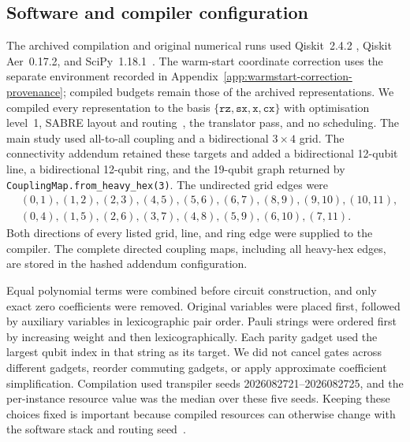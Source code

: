 \documentclass[a4paper,onecolumn,11pt,unpublished]{quantumarticle}
\theoremstyle{remark}
\begin{document}
\subsection{Software and compiler configuration}
The archived compilation and original numerical runs used Qiskit~2.4.2
\cite{Qiskit2024}, Qiskit Aer~0.17.2, and SciPy~1.18.1~\cite{Virtanen2020}. The warm-start coordinate correction
uses the separate environment recorded in
Appendix~\ref{app:warmstart-correction-provenance}; compiled budgets remain
those of the archived representations.  We compiled every representation to the basis
$\{\mathtt{rz},\mathtt{sx},\mathtt{x},\mathtt{cx}\}$ with optimisation
level~1, SABRE layout and routing~\cite{Li2019}, the translator pass,
and no scheduling.
The main study used all-to-all coupling and a bidirectional $3\times4$ grid.
The connectivity addendum retained these targets and added a bidirectional
12-qubit line, a bidirectional 12-qubit ring, and the 19-qubit graph returned
by \texttt{CouplingMap.from\_heavy\_hex(3)}.  The undirected grid edges were
\[
\begin{split}
 &(0,1),(1,2),(2,3),(4,5),(5,6),(6,7),(8,9),(9,10),(10,11),\\
 &(0,4),(1,5),(2,6),(3,7),(4,8),(5,9),(6,10),(7,11).
\end{split}
\]
Both directions of every listed grid, line, and ring edge were supplied to the
compiler.  The complete directed coupling maps, including all heavy-hex
edges, are stored in the hashed addendum configuration.

Equal polynomial terms were combined before circuit construction, and only
exact zero coefficients were removed.  Original variables were placed first,
followed by auxiliary variables in lexicographic pair order.  Pauli strings
were ordered first by increasing weight and then lexicographically.  Each
parity gadget used the largest qubit index in that string as its target.  We
did not cancel gates across different gadgets, reorder commuting gadgets, or
apply approximate coefficient simplification.  Compilation used transpiler
seeds 2026082721--2026082725, and the per-instance resource value was the
median over these five seeds.  Keeping these choices fixed is important because
compiled resources can otherwise change with the software stack and routing
seed~\cite{Weidenfeller2022,Schmidbauer2024,Schmidbauer2026}.
\end{document}
